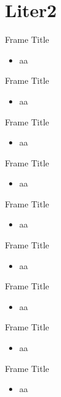 \documentclass{beamer}
\begin{document}
\section{Liter2}
\begin{frame}{Frame Title}
    \begin{itemize}
        \item aa
    \end{itemize}
\end{frame}
\begin{frame}{Frame Title}
    \begin{itemize}
        \item aa
    \end{itemize}
\end{frame}
\begin{frame}{Frame Title}
    \begin{itemize}
        \item aa
    \end{itemize}
\end{frame}
\begin{frame}{Frame Title}
    \begin{itemize}
        \item aa
    \end{itemize}
\end{frame}
\begin{frame}{Frame Title}
    \begin{itemize}
        \item aa
    \end{itemize}
\end{frame}
\begin{frame}{Frame Title}
    \begin{itemize}
        \item aa
    \end{itemize}
\end{frame}
\begin{frame}{Frame Title}
    \begin{itemize}
        \item aa
    \end{itemize}
\end{frame}
\begin{frame}{Frame Title}
    \begin{itemize}
        \item aa
    \end{itemize}
\end{frame}
\begin{frame}{Frame Title}
    \begin{itemize}
        \item aa
    \end{itemize}
\end{frame}
\end{document}
